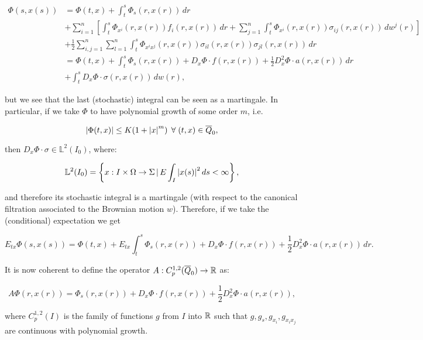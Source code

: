\begin{align*}
    \Phi(s,x(s)) & = \Phi(t,x) + \int_t^s\Phi_s(r,x(r))\,dr \\
    & + \sum_{i=1}^n \left[\int_t^s \Phi_{x^i}(r,x(r))f_i(r,x(r))\,dr + \sum_{j=1}^n\int_t^s\Phi_{x^i}(r,x(r))\sigma_{ij}(r,x(r))\,dw^j(r)\right] \\
    & + \frac{1}{2}\sum_{i,j=1}^n \sum_{l=1}^n\int_t^s\Phi_{x^ix^j}(r,x(r))\sigma_{il}(r,x(r))\sigma_{jl}(r,x(r))\,dr \\
    & = \Phi(t,x) + \int_t^s \Phi_s(r,x(r)) + D_x\Phi\cdot f(r,x(r)) + \frac{1}{2}D^2_x\Phi\cdot a(r,x(r)) \,dr \\
    & + \int_t^s D_x\Phi\cdot\sigma(r,x(r)) \,dw(r), 
\end{align*}

but we see that the last (stochastic) integral can be seen as a martingale. In particular, if we take $\Phi$ to have polynomial growth of some order $m$, i.e.

\begin{equation}
    \abs{\Phi(t,x)} \leq K(1+\abs{x}^m)\,\forall(t,x)\in\overline{Q}_0,
\end{equation}

then $D_x\Phi\cdot\sigma\in\mathbb{L}^2(I_0)$, where:

\[\mathbb{L}^2(I_0) = \left\{x:I\times\Omega\rightarrow\Sigma\,|\,E\int_I\abs{x(s)}^2\,ds<\infty\right\},\]

and therefore its stochastic integral is a martingale (with respect to the canonical filtration associated to the Brownian motion $w$). 
Therefore, if we take the (conditional) expectation we get

\begin{equation}
    E_{tx}\Phi(s,x(s)) = \Phi(t,x) + E_{tx}\int_t^s \Phi_s(r,x(r)) + D_x\Phi\cdot f(r,x(r)) + \frac{1}{2}D^2_x\Phi\cdot a(r,x(r))\,dr.
\end{equation}

It is now coherent to define the operator $A:C_p^{1,2}(\overline{Q}_0)\rightarrow\mathbb{R}$ as:

\begin{equation}\label{2-1-newdefA}
    A\Phi(r,x(r)) = \Phi_s(r,x(r)) + D_x\Phi\cdot f(r,x(r)) + \frac{1}{2}D^2_x\Phi\cdot a(r,x(r)),
\end{equation}

where $C_p^{1,2}(I)$ is the family of functions $g$ from $I$ into $\mathbb{R}$ such that $g,g_s,g_{x_i},g_{x_ix_j}$ are continuous with polynomial growth.

